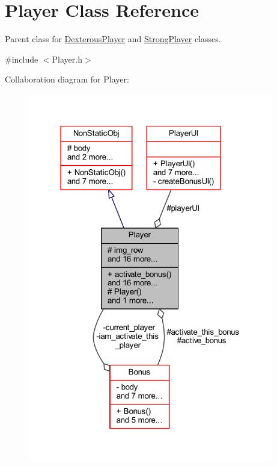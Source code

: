 \hypertarget{class_player}{}\section{Player Class Reference}
\label{class_player}


Parent class for \hyperlink{class_dexterous_player}{Dexterous\+Player} and \hyperlink{class_strong_player}{Strong\+Player} classes.  




{\ttfamily \#include $<$Player.\+h$>$}



Collaboration diagram for Player\+:\nopagebreak
\begin{figure}[H]
\begin{center}
\leavevmode
\includegraphics[width=304pt]{class_player__coll__graph}
\end{center}
\end{figure}

